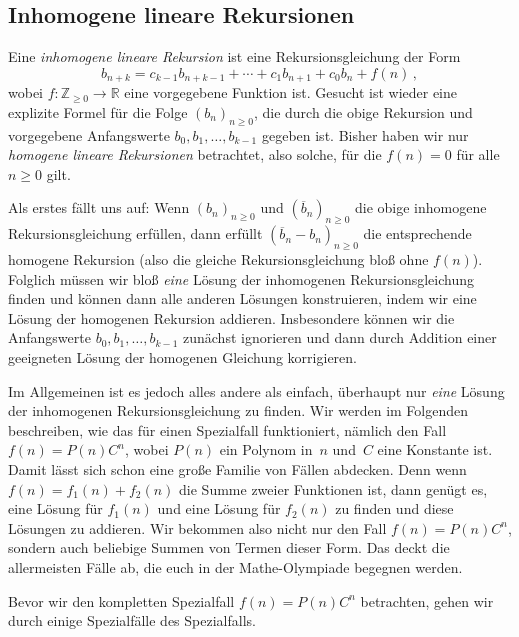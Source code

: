 \subsection*{Inhomogene lineare Rekursionen}
Eine \emph{inhomogene lineare Rekursion} ist eine Rekursionsgleichung der Form
\begin{equation*}
	b_{n+k}=c_{k-1}b_{n+k-1}+\dotsb+c_1b_{n+1}+c_0b_n+f(n)\,,
\end{equation*}
wobei $f\colon \mathbb Z_{\geqslant 0}\rightarrow \mathbb R$ eine vorgegebene Funktion ist. Gesucht ist wieder eine explizite Formel für die Folge $(b_n)_{n\geqslant 0}$, die durch die obige Rekursion und vorgegebene Anfangswerte $b_0,b_1,\dotsc,b_{k-1}$ gegeben ist. Bisher haben wir nur \emph{homogene lineare Rekursionen} betrachtet, also solche, für die $f(n)=0$ für alle $n\geqslant 0$ gilt.

Als erstes fällt uns auf: Wenn $(b_n)_{n\geqslant 0}$ und $(\overline{b}_n)_{n\geqslant 0}$ die obige inhomogene Rekursionsgleichung erfüllen, dann erfüllt $(\overline{b}_n-b_n)_{n\geqslant 0}$ die entsprechende homogene Rekursion (also die gleiche Rekursionsgleichung bloß ohne $f(n)$). Folglich müssen wir bloß \emph{eine} Lösung der inhomogenen Rekursionsgleichung finden und können dann alle anderen Lösungen konstruieren, indem wir eine Lösung der homogenen Rekursion addieren. Insbesondere können wir die Anfangswerte $b_0,b_1,\dotsc,b_{k-1}$ zunächst ignorieren und dann durch Addition einer geeigneten Lösung der homogenen Gleichung korrigieren.

Im Allgemeinen ist es jedoch alles andere als einfach, überhaupt nur \emph{eine} Lösung der inhomogenen Rekursionsgleichung zu finden. Wir werden im Folgenden beschreiben, wie das für einen Spezialfall funktioniert, nämlich den Fall $f(n)=P(n)C^n$, wobei $P(n)$ ein Polynom in~$n$ und~$C$ eine Konstante ist. Damit lässt sich schon eine große Familie von Fällen abdecken. Denn wenn $f(n)=f_1(n)+f_2(n)$ die Summe zweier Funktionen ist, dann genügt es, eine Lösung für $f_1(n)$ und eine Lösung für $f_2(n)$ zu finden und diese Lösungen zu addieren. Wir bekommen also nicht nur den Fall $f(n)=P(n)C^n$, sondern auch beliebige Summen von Termen dieser Form. Das deckt die allermeisten Fälle ab, die euch in der Mathe-Olympiade begegnen werden.

Bevor wir den kompletten Spezialfall $f(n)=P(n)C^n$ betrachten, gehen wir durch einige Spezialfälle des Spezialfalls.

